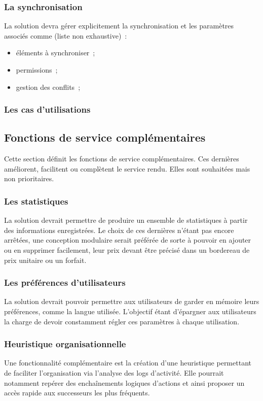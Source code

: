 \subsubsection{La synchronisation}
La solution devra gérer explicitement la synchronisation et les paramètres associés comme (liste non exhaustive)~:
\begin{itemize}
\item éléments à synchroniser~;
\item permissions~;
\item gestion des conflits~;
\end{itemize}

\subsubsection{Les cas d'utilisations}

\subsection{Fonctions de service complémentaires}
Cette section définit les fonctions de service complémentaires. Ces dernières améliorent, facilitent ou complètent le service rendu. Elles sont souhaitées mais non prioritaires.

\subsubsection{Les statistiques}
La solution devrait permettre de produire un ensemble de statistiques à partir des informations enregistrées. Le choix de ces dernières n'étant pas encore arrêtées, une conception modulaire serait préférée de sorte à pouvoir en ajouter ou en supprimer facilement, leur prix devant être précisé dans un bordereau de prix unitaire ou un forfait.

\subsubsection{Les préférences d'utilisateurs}
La solution devrait pouvoir permettre aux utilisateurs de garder en mémoire leurs préférences, comme la langue utilisée. L'objectif étant d'épargner aux utilisateurs la charge de devoir constamment régler ces paramètres à chaque utilisation.

\subsubsection{Heuristique organisationnelle}
Une fonctionnalité complémentaire est la création d'une heuristique permettant de faciliter l'organisation via l'analyse des logs d'activité. Elle pourrait notamment repérer des enchaînements logiques d'actions et ainsi proposer un accès rapide aux successeurs les plus fréquents.

